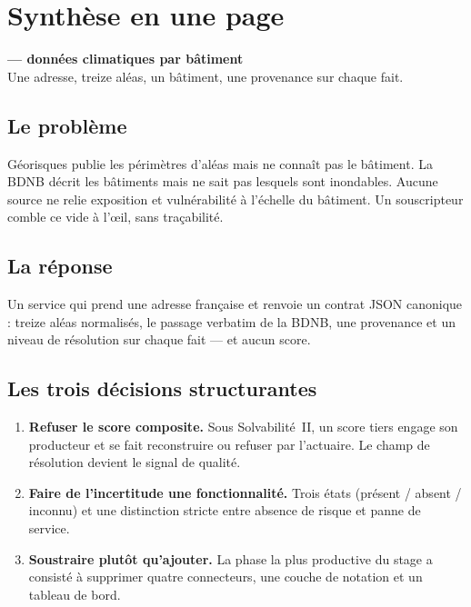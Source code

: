\chapter*{Synthèse en une page}

\begin{center}
\begin{tcolorbox}[colback=typhoonDeep,colframe=typhoonBlue!0,arc=3pt,
  left=10pt,right=10pt,top=8pt,bottom=8pt,width=\textwidth]
\centering
{\color{white}\sffamily\bfseries\large \typhoon{} — données climatiques par
bâtiment}\\[3pt]
{\color{white!85}\sffamily\small Une adresse, treize aléas, un bâtiment, une
provenance sur chaque fait.}
\end{tcolorbox}
\end{center}

\section*{Le problème}

Géorisques publie les périmètres d'aléas mais ne connaît pas le bâtiment. La
BDNB décrit les bâtiments mais ne sait pas lesquels sont inondables. Aucune
source ne relie exposition et vulnérabilité à l'échelle du bâtiment. Un
souscripteur comble ce vide à l'œil, sans traçabilité.

\section*{La réponse}

Un service qui prend une adresse française et renvoie un contrat JSON
canonique : treize aléas normalisés, le passage verbatim de la BDNB, une
provenance et un niveau de résolution sur chaque fait — et aucun score.

\section*{Les trois décisions structurantes}

\begin{enumerate}[leftmargin=1.5em,itemsep=3pt]
  \item \textbf{Refuser le score composite.} Sous Solvabilité~II, un score
        tiers engage son producteur et se fait reconstruire ou refuser par
        l'actuaire. Le champ de résolution devient le signal de qualité.
  \item \textbf{Faire de l'incertitude une fonctionnalité.} Trois états
        (présent / absent / inconnu) et une distinction stricte entre absence
        de risque et panne de service.
  \item \textbf{Soustraire plutôt qu'ajouter.} La phase la plus productive du
        stage a consisté à supprimer quatre connecteurs, une couche de
        notation et un tableau de bord.
\end{enumerate}

